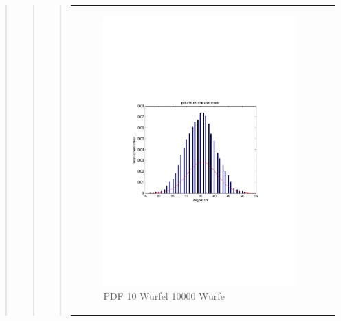 \begin{quote}
\begin{quote}
\begin{quote}
\begin{center}
\begin{tabular}{ll}
            \hspace{-14em}
                \begin{minipage}{0.6\textwidth}

                    \begin{figure}[H]
                        \label{fig:}
                        \includegraphics[scale=0.6, trim = 3cm 8.5cm 3.5cm 8.5cm, clip]{./Bilder/10wuerfelpdf} %
                        \caption{PDF 10 Würfel 10000 Würfe}
                    \end{figure}

                \end{minipage}
                \begin{minipage}{0.6\textwidth}


\end{minipage}
\end{tabular}
\end{center}
\end{quote}
\end{quote}
\end{quote}
